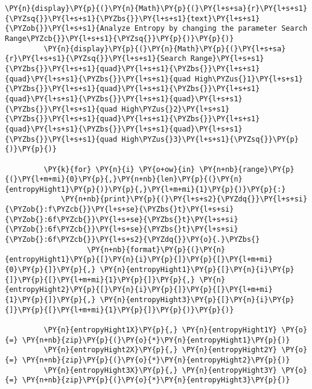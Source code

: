 {\begin{enumerate}
\begin{Verbatim}[commandchars=\\\{\}]
         \PY{n}{display}\PY{p}{(}\PY{n}{Math}\PY{p}{(}\PY{l+s+sa}{r}\PY{l+s+s1}{\PYZsq{}}\PY{l+s+s1}{\PYZbs{}}\PY{l+s+s1}{text}\PY{l+s+s1}{\PYZob{}}\PY{l+s+s1}{Analyze Entropy by changing the parameter Search Range\PYZcb{}}\PY{l+s+s1}{\PYZsq{}}\PY{p}{)}\PY{p}{)}
         \PY{n}{display}\PY{p}{(}\PY{n}{Math}\PY{p}{(}\PY{l+s+sa}{r}\PY{l+s+s1}{\PYZsq{}}\PY{l+s+s1}{Search Range}\PY{l+s+s1}{\PYZbs{}}\PY{l+s+s1}{quad}\PY{l+s+s1}{\PYZbs{}}\PY{l+s+s1}{quad}\PY{l+s+s1}{\PYZbs{}}\PY{l+s+s1}{quad High\PYZus{}1}\PY{l+s+s1}{\PYZbs{}}\PY{l+s+s1}{quad}\PY{l+s+s1}{\PYZbs{}}\PY{l+s+s1}{quad}\PY{l+s+s1}{\PYZbs{}}\PY{l+s+s1}{quad}\PY{l+s+s1}{\PYZbs{}}\PY{l+s+s1}{quad High\PYZus{}2}\PY{l+s+s1}{\PYZbs{}}\PY{l+s+s1}{quad}\PY{l+s+s1}{\PYZbs{}}\PY{l+s+s1}{quad}\PY{l+s+s1}{\PYZbs{}}\PY{l+s+s1}{quad}\PY{l+s+s1}{\PYZbs{}}\PY{l+s+s1}{quad High\PYZus{}3}\PY{l+s+s1}{\PYZsq{}}\PY{p}{)}\PY{p}{)}
         
         \PY{k}{for} \PY{n}{i} \PY{o+ow}{in} \PY{n+nb}{range}\PY{p}{(}\PY{l+m+mi}{0}\PY{p}{,}\PY{n+nb}{len}\PY{p}{(}\PY{n}{entropyHight1}\PY{p}{)}\PY{p}{,}\PY{l+m+mi}{1}\PY{p}{)}\PY{p}{:}
             \PY{n+nb}{print}\PY{p}{(}\PY{l+s+s2}{\PYZdq{}}\PY{l+s+si}{\PYZob{}:f\PYZcb{}}\PY{l+s+se}{\PYZbs{}t}\PY{l+s+si}{\PYZob{}:6f\PYZcb{}}\PY{l+s+se}{\PYZbs{}t}\PY{l+s+si}{\PYZob{}:6f\PYZcb{}}\PY{l+s+se}{\PYZbs{}t}\PY{l+s+si}{\PYZob{}:6f\PYZcb{}}\PY{l+s+s2}{\PYZdq{}}\PY{o}{.}\PYZbs{}
                   \PY{n+nb}{format}\PY{p}{(}\PY{n}{entropyHight1}\PY{p}{[}\PY{n}{i}\PY{p}{]}\PY{p}{[}\PY{l+m+mi}{0}\PY{p}{]}\PY{p}{,} \PY{n}{entropyHight1}\PY{p}{[}\PY{n}{i}\PY{p}{]}\PY{p}{[}\PY{l+m+mi}{1}\PY{p}{]}\PY{p}{,} \PY{n}{entropyHight2}\PY{p}{[}\PY{n}{i}\PY{p}{]}\PY{p}{[}\PY{l+m+mi}{1}\PY{p}{]}\PY{p}{,} \PY{n}{entropyHight3}\PY{p}{[}\PY{n}{i}\PY{p}{]}\PY{p}{[}\PY{l+m+mi}{1}\PY{p}{]}\PY{p}{)}\PY{p}{)}
         
         \PY{n}{entropyHight1X}\PY{p}{,} \PY{n}{entropyHight1Y} \PY{o}{=} \PY{n+nb}{zip}\PY{p}{(}\PY{o}{*}\PY{n}{entropyHight1}\PY{p}{)}
         \PY{n}{entropyHight2X}\PY{p}{,} \PY{n}{entropyHight2Y} \PY{o}{=} \PY{n+nb}{zip}\PY{p}{(}\PY{o}{*}\PY{n}{entropyHight2}\PY{p}{)}
         \PY{n}{entropyHight3X}\PY{p}{,} \PY{n}{entropyHight3Y} \PY{o}{=} \PY{n+nb}{zip}\PY{p}{(}\PY{o}{*}\PY{n}{entropyHight3}\PY{p}{)}
         

\end{Verbatim}
\end{enumerate}}
